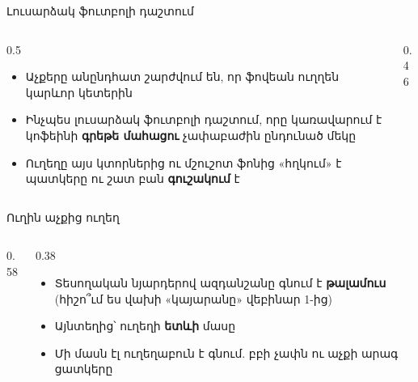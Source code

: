 \begin{frame}{Լուսարձակ ֆուտբոլի դաշտում}
  \begin{columns}[T]
    \begin{column}{0.5\textwidth}
      \begin{itemize}
        \item Աչքերը անընդհատ շարժվում են, որ ֆովեան ուղղեն կարևոր կետերին
        \item<2-> Ինչպես լուսարձակ ֆուտբոլի դաշտում, որը կառավարում է կոֆեինի \textbf{գրեթե մահացու} չափաբաժին ընդունած մեկը
        \item<3-> Ուղեղը այս կտորներից ու մշուշոտ ֆոնից «հղկում» է պատկերը ու շատ բան \textbf{գուշակում} է
      \end{itemize}
    \end{column}
    \begin{column}{0.46\textwidth}
    \end{column}
  \end{columns}
\end{frame}

\begin{frame}{Ուղին աչքից ուղեղ}
  \begin{columns}[c]
    \begin{column}{0.58\textwidth}
      \centering
      
    \end{column}
    \begin{column}{0.38\textwidth}
      \begin{itemize}
        \item Տեսողական նյարդերով ազդանշանը գնում է \textbf{թալամուս} {\small(հիշո՞ւմ ես վախի «կայարանը» վեբինար 1-ից)}
        \item<2-> Այնտեղից՝ ուղեղի \textbf{ետևի} մասը
        \item<3-> Մի մասն էլ ուղեղաբուն է գնում. բբի չափն ու աչքի արագ ցատկերը
      \end{itemize}
    \end{column}
  \end{columns}
\end{frame}

